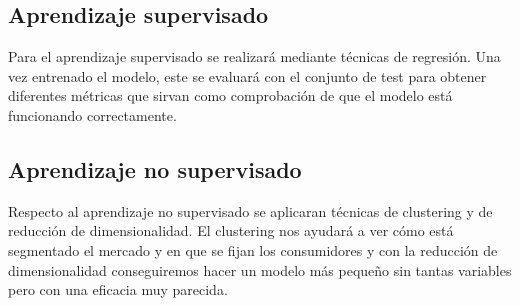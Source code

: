 \documentclass{wsdcr}
\begin{document}
\subsection{Aprendizaje supervisado}
Para el aprendizaje supervisado se realizará mediante técnicas de regresión. Una vez entrenado el modelo, este se evaluará con el conjunto de test para obtener diferentes métricas que sirvan como comprobación de que el modelo está funcionando correctamente.
\subsection{Aprendizaje no supervisado}
Respecto al aprendizaje no supervisado se aplicaran técnicas de clustering y de reducción de dimensionalidad. El clustering nos ayudará a ver cómo está segmentado el mercado y en que se fijan los consumidores y con la reducción de dimensionalidad conseguiremos hacer un modelo más pequeño sin tantas variables pero con una eficacia muy parecida.
\end{document}
